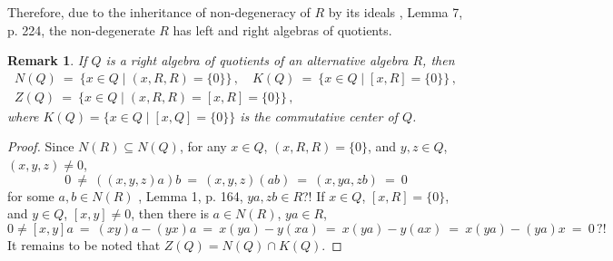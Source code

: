 \documentclass[a4paper,11pt]{article}
\newtheorem{rem}[defi]{Remark}
\begin{document}
Therefore, due to the inheritance of non-degeneracy of $R$ by its ideals 
\cite{ZShS}, Lemma 7, p. 224, the non-degenerate $R$ has left and 
right algebras of quotients. 

\begin{rem}
If $Q$ is a right algebra of quotients of an alternative algebra $R$, then 
\begin{gather*}
N(Q)\ =\ \{x\in Q\mid (x, R, R)=\{0\}\}\,,\quad 
K(Q)\ =\ \{x\in Q\mid [x, R]=\{0\}\}\,,\\
Z(Q)\ =\ \{x\in Q\mid (x, R, R)=[x, R]=\{0\}\}\,,
\end{gather*}
where ${K(Q)=\{x\in Q\mid [x, Q]=\{0\}\}}$ is the commutative center of $Q$.
\end{rem}

\begin{proof}
Since ${N(R)\subseteq N(Q)}$, for any ${x\in Q}$, 
${(x, R, R)=\{0\}}$, and ${y, z\in Q}$, ${(x, y, z)\ne 0}$, 
\[
0\ \ne\ ((x, y, z) a) b\ =\ (x, y, z) (a b)\ =\ (x, y a, z b)\ =\ 0
\] 
for some ${a, b\in N(R)}$ \cite{ZShS}, Lemma 1, p. 164, 
${y a, z b\in R}$?! If ${x\in Q}$, ${[x, R]=\{0\}}$, and 
${y\in Q}$, ${[x, y]\ne 0}$, then there is ${a\in N(R)}$, ${y a\in R}$, 
\[
0\ne [x, y] a\ =\ (x y) a-(y x) a\ =\ x (y a)-y (x a)\ =\ 
x (y a)-y (a x)\ =\ x (y a)-(y a) x\ =\ 0\,?! 
\]
It remains to be noted that ${Z(Q)=N(Q)\cap K(Q)}$.
\end{proof}
\end{document}

